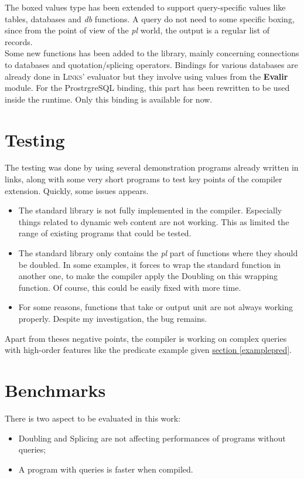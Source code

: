 \documentclass[11pt]{article}
\newcommand\mysc[1]{{\rmfamily\textsc{#1}}\xspace}
\newcommand\links{\mysc{Links}}
\newcommand\refsec[1]{\hyperref[#1]{section \ref*{#1}}}
\newcommand\effect[1]{{\em #1}}
\newcommand\module[1]{{\bf #1}}
\begin{document}
The boxed values type has been extended to support query-specific values like tables, databases and \effect{db} functions. A query do not need to some specific boxing, since from the point of view of the \effect{pl} world, the output is a regular list of records.\\

Some new functions has been added to the library, mainly concerning connections to databases and quotation/splicing operators. Bindings for various databases are already done in \links' evaluator but they involve using values from the \module{Evalir} module. For the ProstrgreSQL binding, this part has been rewritten to be used inside the runtime. Only this binding is available for now.

\section{Testing}

The testing was done by using several demonstration programs already written in links, along with some very short programs to test key points of the compiler extension. Quickly, some issues appears.
\begin{itemize}
\item The standard library is not fully implemented in the compiler. Especially things related to dynamic web content are not working. This as limited the range of existing programs that could be tested.
\item The standard library only contains the \effect{pl} part of functions where they should be doubled. In some examples, it forces to wrap the standard function in another one, to make the compiler apply the Doubling on this wrapping function. Of course, this could be easily fixed with more time.
\item For some reasons, functions that take or output unit are not always working properly. Despite my investigation, the bug remains.
\end{itemize}

Apart from theses negative points, the compiler is working on complex queries with high-order features like the predicate example given \refsec{examplepred}.

\section{Benchmarks}

There is two aspect to be evaluated in this work: 
\begin{itemize}
\item Doubling and Splicing are not affecting performances of programs without queries;
\item A program with queries is faster when compiled.
\end{itemize}
\end{document}

